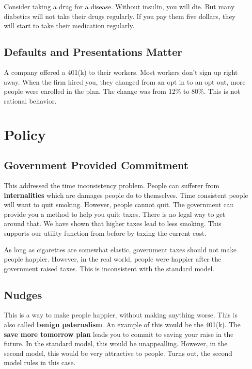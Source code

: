 \documentclass{article}
\begin{document}
Consider taking a drug for a disease. Without insulin, you will die. But many
diabetics will not take their drugs regularly. If you pay them five dollars,
they will start to take their medication regularly.

\subsection{Defaults and Presentations Matter}

A company offered a 401(k) to their workers. Most workers don't sign up right
away. When the firm hired you, they changed from an opt in to an opt out, more
people were enrolled in the plan. The change was from 12\% to 80\%. This is not
rational behavior. 

\section{Policy}

\subsection{Government Provided Commitment} 

This addressed the time inconsistency problem. People can sufferer from
\textbf{internalities} which are damages people do to themselves. Time
consistent people will want to quit smoking. However, people cannot quit. The
government can provide you a method to help you quit: taxes. There is no legal
way to get around that. We have shown that higher taxes lead to less smoking.
This supports our utility function from before by taxing the current cost. 

As long as cigarettes are somewhat elastic, government taxes should not make
people happier. However, in the real world, people were happier after the
government raised taxes. This is inconsistent with the standard model.

\subsection{Nudges}

This is a way to make people happier, without making anything worse. This is
also called \textbf{benign paternalism}. An example of this would be the 401(k).
The \textbf{save more tomorrow plan} leads you to commit to saving your raise in
the future. In the standard model, this would be unappealling. However, in the
second model, this would be very attractive to people. Turns out, the second
model rules in this case.
\end{document}
